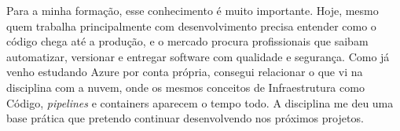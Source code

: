 Para a minha formação, esse conhecimento é muito importante. Hoje, mesmo quem trabalha principalmente
com desenvolvimento precisa entender como o código chega até a produção, e o mercado procura
profissionais que saibam automatizar, versionar e entregar software com qualidade e segurança. Como
já venho estudando Azure por conta própria, consegui relacionar o que vi na disciplina com a nuvem,
onde os mesmos conceitos de Infraestrutura como Código, \textit{pipelines} e containers aparecem o
tempo todo. A disciplina me deu uma base prática que pretendo continuar desenvolvendo nos próximos
projetos.
